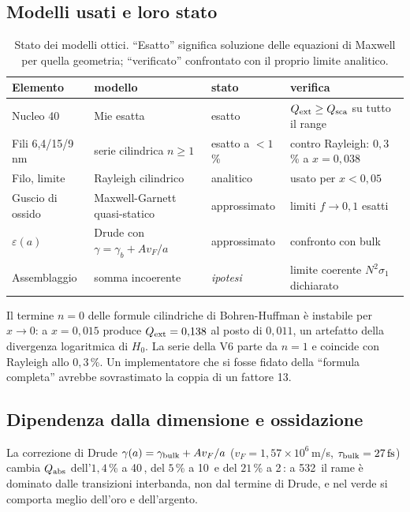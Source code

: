 \documentclass[11pt,a4paper]{article}
\providecommand{\toprule}{\hline}
\providecommand{\midrule}{\hline}
\providecommand{\bottomrule}{\hline}
\providecommand{\SI}[2]{#1\,\text{#2}}
\begin{document}
\subsection{Modelli usati e loro stato}

\begin{table}[H]
\centering\small
\caption{Stato dei modelli ottici. ``Esatto'' significa soluzione delle equazioni di
Maxwell per quella geometria; ``verificato'' confrontato con il proprio limite
analitico.}
\label{tab:ottica}
\begin{tabular}{p{3.4cm}p{3.0cm}p{2.8cm}p{4.6cm}}
\toprule
Elemento & modello & stato & verifica \\
\midrule
Nucleo \SI{40}{nm} & Mie esatta & esatto & $Q_{\rm ext}\ge Q_{\rm sca}$ su tutto il range \\
Fili 6,4/15/9\,nm & serie cilindrica $n\ge1$ & esatto a $<1$\,\% & contro Rayleigh: $0{,}3$\,\% a $x=0{,}038$ \\
Filo, limite & Rayleigh cilindrico & analitico & usato per $x<0{,}05$ \\
Guscio di ossido & Maxwell-Garnett quasi-statico & approssimato & limiti $f\to0,1$ esatti \\
$\varepsilon(a)$ & Drude con $\gamma=\gamma_b+Av_F/a$ & approssimato & confronto con bulk \\
Assemblaggio & somma incoerente & \emph{ipotesi} & limite coerente $N^2\sigma_1$ dichiarato \\
\bottomrule
\end{tabular}
\end{table}

Il termine $n=0$ delle formule cilindriche di Bohren-Huffman \`e instabile per
$x\to0$: a $x=0{,}015$ produce $Q_{\rm ext}=0{,}138$ al posto di $0{,}011$, un
artefatto della divergenza logaritmica di $H_0$. La serie della V6 parte da $n=1$ e
coincide con Rayleigh allo $0{,}3$\,\%. Un implementatore che si fosse fidato della
``formula completa'' avrebbe sovrastimato la coppia di un fattore 13.

\subsection{Dipendenza dalla dimensione e ossidazione}

La correzione di Drude $\gamma(a)=\gamma_{\rm bulk}+Av_F/a$ ($v_F=1{,}57\times10^6$\,m/s,
$\tau_{\rm bulk}=\SI{27}{fs}$) cambia $Q_{\rm abs}$ dell'$1{,}4$\,\% a \SI{40}{nm},
del $5$\,\% a \SI{10}{nm} e del $21$\,\% a \SI{2}{nm}: a \SI{532}{nm} il rame \`e
dominato dalle transizioni interbanda, non dal termine di Drude, e nel verde si
comporta meglio dell'oro e dell'argento.
\end{document}
